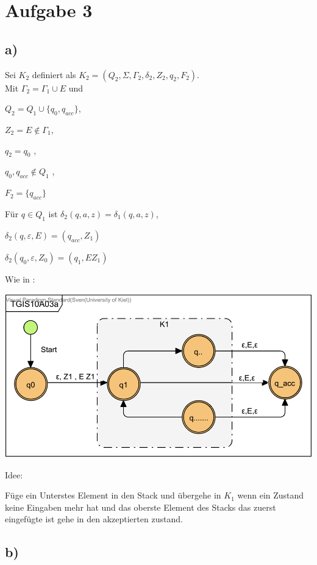 \section*{Aufgabe 3}

\subsection*{a)}
Sei $K_2$ definiert als $K_2=(Q_2, \Sigma , \Gamma_2 , \delta_2 , Z_2, q_2, F_2 )$.\\
 Mit $\Gamma_2 = \Gamma_1 \cup {E}$ und
 
 $Q_2 = Q_1 \cup \{ q_0, q_{acc}\}$,
 
 $ Z_2 = E \notin \Gamma_1$,

 $q_2 = q_0$ ,
 
 $q_0,q_{acc} \notin Q_1$ ,
 
 $F_2 = \{ q_{acc} \}$
 
Für $q \in Q_1$ ist $\delta_2 (q,a,z) = \delta_1 (q,a,z) $,

 $\delta_2 (q,\varepsilon ,E) = (q_{acc}, Z_1) $ 

 $\delta_2 (q_0,\varepsilon ,Z_0) = (q_1, E Z_1) $
 
 Wie in :
 
\includegraphics[width=\textwidth]{part/TGIS10A03a}

Idee:

Füge ein Unterstes Element in den Stack und übergehe in $K_1$ wenn ein Zustand keine Eingaben mehr hat und das oberste Element des Stacks das zuerst eingefügte ist gehe in  den akzeptierten zustand.

\newpage

\subsection*{b)}

